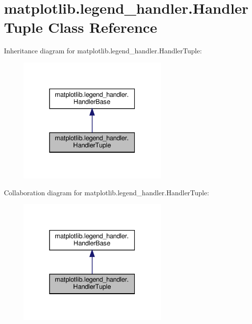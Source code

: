 \hypertarget{classmatplotlib_1_1legend__handler_1_1HandlerTuple}{}\section{matplotlib.\+legend\+\_\+handler.\+Handler\+Tuple Class Reference}
\label{classmatplotlib_1_1legend__handler_1_1HandlerTuple}


Inheritance diagram for matplotlib.\+legend\+\_\+handler.\+Handler\+Tuple\+:
\nopagebreak
\begin{figure}[H]
\begin{center}
\leavevmode
\includegraphics[width=210pt]{classmatplotlib_1_1legend__handler_1_1HandlerTuple__inherit__graph}
\end{center}
\end{figure}


Collaboration diagram for matplotlib.\+legend\+\_\+handler.\+Handler\+Tuple\+:
\nopagebreak
\begin{figure}[H]
\begin{center}
\leavevmode
\includegraphics[width=210pt]{classmatplotlib_1_1legend__handler_1_1HandlerTuple__coll__graph}
\end{center}
\end{figure}
